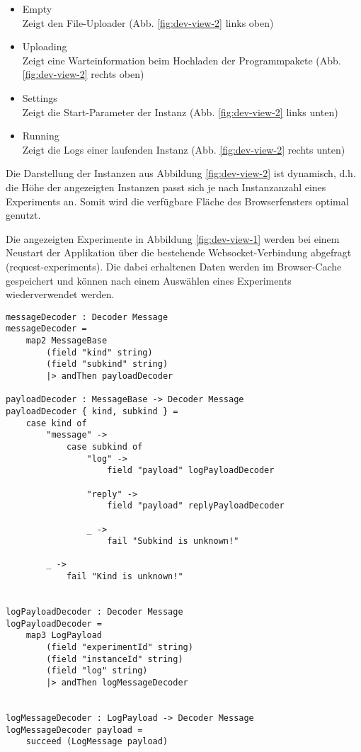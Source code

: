 \begin{itemize}
  \item Empty
    \\ Zeigt den File-Uploader
    (Abb. \ref{fig:dev-view-2} links oben)
  \item Uploading
    \\ Zeigt eine Warteinformation beim Hochladen der Programmpakete
    (Abb. \ref{fig:dev-view-2} rechts oben)
  \item Settings
    \\ Zeigt die Start-Parameter der Instanz
    (Abb. \ref{fig:dev-view-2} links unten)
  \item Running
    \\ Zeigt die Logs einer laufenden Instanz
    (Abb. \ref{fig:dev-view-2} rechts unten)
\end{itemize}
Die Darstellung der Instanzen aus Abbildung \ref{fig:dev-view-2} ist dynamisch, d.h. die Höhe der angezeigten Instanzen passt sich je nach Instanzanzahl eines Experiments an.
Somit wird die verfügbare Fläche des Browserfensters optimal genutzt.
\par Die angezeigten Experimente in Abbildung \ref{fig:dev-view-1} werden bei einem Neustart der Applikation über die bestehende Websocket-Verbindung abgefragt (request-experiments).
Die dabei erhaltenen Daten werden im Browser-Cache gespeichert und können nach einem Auswählen eines Experiments wiederverwendet werden.
\clearpage
\begin{verbatim}
messageDecoder : Decoder Message
messageDecoder =
    map2 MessageBase
        (field "kind" string)
        (field "subkind" string)
        |> andThen payloadDecoder

payloadDecoder : MessageBase -> Decoder Message
payloadDecoder { kind, subkind } =
    case kind of
        "message" ->
            case subkind of
                "log" ->
                    field "payload" logPayloadDecoder

                "reply" ->
                    field "payload" replyPayloadDecoder

                _ ->
                    fail "Subkind is unknown!"

        _ ->
            fail "Kind is unknown!"


logPayloadDecoder : Decoder Message
logPayloadDecoder =
    map3 LogPayload
        (field "experimentId" string)
        (field "instanceId" string)
        (field "log" string)
        |> andThen logMessageDecoder


logMessageDecoder : LogPayload -> Decoder Message
logMessageDecoder payload =
    succeed (LogMessage payload)
\end{verbatim}
